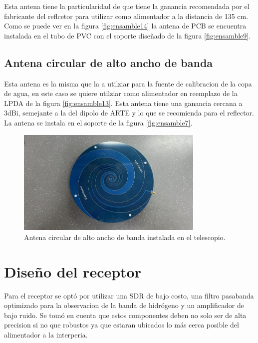 Esta antena tiene la particularidad de que tiene la ganancia recomendada por el fabricante del reflcetor para utilizar como alimentador a la distancia de 135 cm. Como se puede ver en la figura \ref{fig:ensamble14} la antena de PCB se encuentra instalada en el tubo de PVC con el soporte diseñado de la figura \ref{fig:ensamble9}.\\

\subsection{Antena circular de alto ancho de banda}

Esta antena es la misma que la a utilziar para la fuente de calibracion de la copa de agua, en este caso se quiere utilziar como alimentador en reemplazo de la LPDA de la figura \ref{fig:ensamble13}. Esta antena tiene una ganancia cercana a 3dBi, semejante a la del dipolo de ARTE y lo que se recomienda para el reflector. La antena se instala en el soporte de la figura \ref{fig:ensamble7}.\\

\begin{figure}
    \centering
    \includegraphics[width=0.8\textwidth]{img/paletaFeed}
    \caption{Antena circular de alto ancho de banda instalada en el telescopio.}
    \label{fig:ensamble15}
\end{figure}


\section{Diseño del receptor}

Para el receptor se optó por utilizar una SDR de bajo costo, una filtro pasabanda optimizado para la observacion de la banda de hidrógeno y un amplificador de bajo ruido. Se tomó en cuenta que estos componentes deben no solo ser de alta precision si no que robustos ya que estaran ubicados lo más cerca posible del alimentador a la interperia.\\


